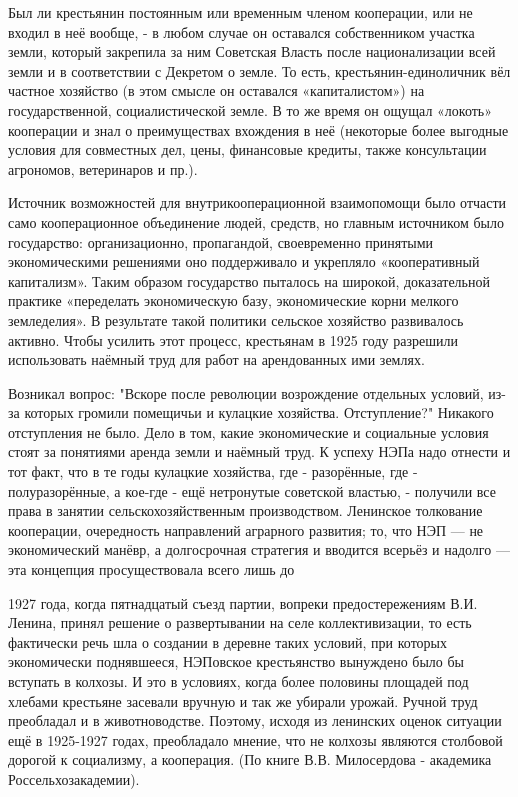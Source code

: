 \label{100-1}
Был ли крестьянин постоянным или временным членом кооперации, или не входил в неё вообще, - в любом случае он оставался собственником участка земли, который закрепила за ним Советская Власть после национализации всей земли и в соответствии с Декретом о земле. То есть, крестьянин-единоличник вёл частное хозяйство (в этом смысле он оставался «капиталистом») на государственной, социалистической земле. В то же время он ощущал «локоть» кооперации и знал о преимуществах вхождения в неё (некоторые более выгодные условия для совместных дел, цены, финансовые кредиты, также консультации агрономов, ветеринаров и пр.).

\label{101-1}
Источник возможностей для внутрикооперационной взаимопомощи было отчасти само кооперационное объединение людей, средств, но главным источником было государство: организационно, пропагандой, своевременно принятыми экономическими решениями оно поддерживало и укрепляло «кооперативный капитализм». Таким образом государство пыталось на широкой, доказательной практике «переделать экономическую базу, экономические корни мелкого земледелия». В результате такой политики сельское хозяйство развивалось активно. Чтобы усилить этот процесс, крестьянам в 1925 году разрешили использовать наёмный труд для работ на арендованных ими землях.

\label{102-1}
Возникал вопрос: "Вскоре после революции возрождение отдельных условий, из-за которых громили помещичьи и кулацкие хозяйства. Отступление?" Никакого отступления не было. Дело в том, какие экономические и социальные условия стоят за понятиями аренда земли и наёмный труд. К успеху НЭПа надо отнести и тот факт, что в те годы кулацкие хозяйства, где - разорённые, где - полуразорённые, а кое-где - ещё нетронутые советской властью, - получили все права в занятии сельскохозяйственным производством. 
Ленинское толкование кооперации, очередность направлений аграрного развития; то, что НЭП — не экономический манёвр, а долгосрочная стратегия и вводится всерьёз и надолго — эта концепция просуществовала всего лишь до 

\label{103-1}
1927 года, когда пятнадцатый съезд партии, вопреки предостережениям В.И. Ленина, принял решение о развертывании на селе коллективизации, то есть фактически речь шла о создании в деревне таких условий, при которых экономически поднявшееся, НЭПовское крестьянство вынуждено было бы вступать в колхозы. И это в условиях, когда более половины площадей под хлебами крестьяне засевали вручную и так же убирали урожай. Ручной труд преобладал и в животноводстве. Поэтому, исходя из ленинских оценок ситуации ещё в 1925-1927 годах, преобладало мнение, что не колхозы являются столбовой дорогой к социализму, а кооперация. (По книге В.В. Милосердова - академика Россельхозакадемии).

